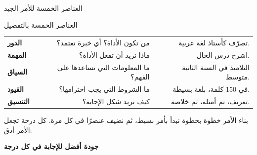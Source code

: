 \documentclass[aspectratio=169, 11pt, xcolor={table}]{beamer}
\begin{document}
\begin{frame}{العناصر الخمسة للأمر الجيد}
    \begin{center}
    \end{center}
\end{frame}

\begin{frame}{العناصر الخمسة بالتفصيل}
    \begin{tabularx}{\textwidth}{|>{\centering\arraybackslash}p{2cm}|R|R|}
        \hline
         &  &  \\ \hline
        \textbf{الدور}    & من تكون الأداة؟ أي خبرة تعتمد؟ & تصرّف كأستاذ لغة عربية. \\ \hline
        \textbf{المهمة}   & ماذا نريد أن تفعل الأداة؟ & اشرح درس الحال. \\ \hline
        \textbf{السياق}   & ما المعلومات التي تساعدها على الفهم؟ & التلاميذ في السنة الثانية متوسط. \\ \hline
        \textbf{القيود}   & ما الشروط التي يجب احترامها؟ & في 150 كلمة، بلغة بسيطة. \\ \hline
        \textbf{التنسيق}  & كيف نريد شكل الإجابة؟ & تعريف، ثم أمثلة، ثم خلاصة. \\ \hline
    \end{tabularx}
\end{frame}

\begin{frame}{بناء الأمر خطوة بخطوة}
    نبدأ بأمر بسيط، ثم نضيف عنصرًا في كل مرة. كل درجة تجعل الأمر أدق:
    \begin{center}
    \end{center}
    \begin{center}
        {\color{tealDeep}\faArrowLeft}\quad \textbf{جودة أفضل للإجابة في كل درجة}
    \end{center}
\end{frame}
\end{document}
